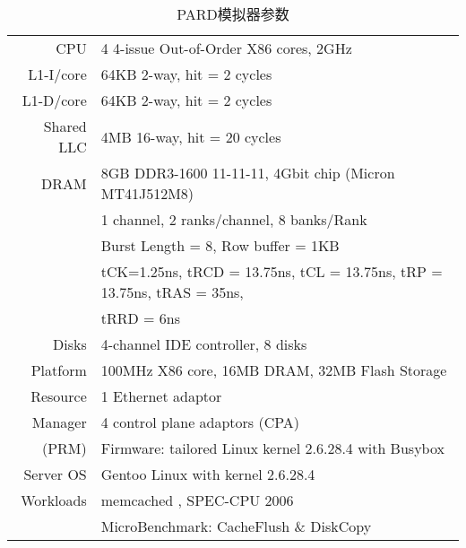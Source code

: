 \begin{table}[ht]
  \centering
  \begin{minipage}[t]{0.9\linewidth}
  \caption{PARD模拟器参数}  
  \label{tab:pard-sim-setup}
    \begin{tabular*}{\linewidth}{rl}
      \toprule[1.5pt]
      CPU                  & 4 4-issue Out-of-Order X86 cores, 2GHz\\
      L1-I/core            & 64KB 2-way, hit = 2 cycles \\
      L1-D/core            & 64KB 2-way, hit = 2 cycles \\
      Shared LLC           & 4MB 16-way, hit = 20 cycles \\
      \hline
      DRAM                 & 8GB DDR3-1600 11-11-11, 4Gbit chip (Micron MT41J512M8) \\
                           & 1 channel, 2 ranks/channel, 8 banks/Rank \\
                           & Burst Length = 8, Row buffer = 1KB \\
                           & tCK=1.25ns, tRCD = 13.75ns, tCL = 13.75ns, tRP = 13.75ns, tRAS = 35ns, \\
                           & tRRD = 6ns \\
      \hline
      Disks                & 4-channel IDE controller, 8 disks \\
      \hline
      Platform             & 100MHz X86 core, 16MB DRAM, 32MB Flash Storage \\
      Resource             & 1 Ethernet adaptor  \\
      Manager              & 4 control plane adaptors (CPA) \\
      (PRM)                & Firmware: tailored Linux kernel 2.6.28.4 with Busybox \cite{busybox} \\
      \hline
      Server OS            & Gentoo Linux with kernel 2.6.28.4 \\
      \hline
      Workloads            & memcached \cite{memcached}, SPEC-CPU 2006 \cite{cpu2006} \\
                           & MicroBenchmark: CacheFlush \& DiskCopy \\
      \bottomrule[1.5pt]
    \end{tabular*}\\[2pt]
  \end{minipage}
\end{table}

